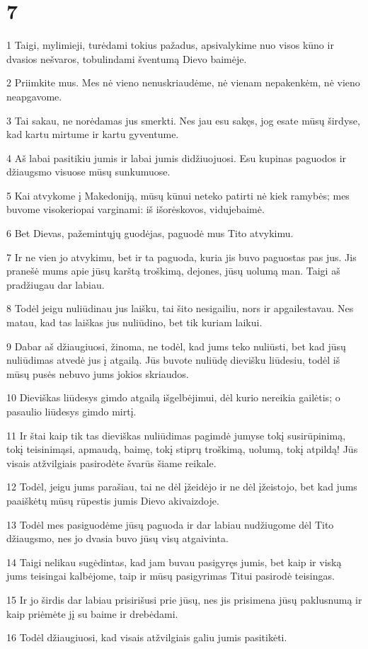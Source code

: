 \chapter{7}


\par 1 Taigi, mylimieji, turėdami tokius pažadus, apsivalykime nuo visos kūno ir dvasios nešvaros, tobulindami šventumą Dievo baimėje. 
\par 2 Priimkite mus. Mes nė vieno nenuskriaudėme, nė vienam nepakenkėm, nė vieno neapgavome. 
\par 3 Tai sakau, ne norėdamas jus smerkti. Nes jau esu sakęs, jog esate mūsų širdyse, kad kartu mirtume ir kartu gyventume. 
\par 4 Aš labai pasitikiu jumis ir labai jumis didžiuojuosi. Esu kupinas paguodos ir džiaugsmo visuose mūsų sunkumuose. 
\par 5 Kai atvykome į Makedoniją, mūsų kūnui neteko patirti nė kiek ramybės; mes buvome visokeriopai varginami: iš išorės­kovos, viduje­baimė. 
\par 6 Bet Dievas, pažemintųjų guodėjas, paguodė mus Tito atvykimu. 
\par 7 Ir ne vien jo atvykimu, bet ir ta paguoda, kuria jis buvo paguostas pas jus. Jis pranešė mums apie jūsų karštą troškimą, dejones, jūsų uolumą man. Taigi aš pradžiugau dar labiau. 
\par 8 Todėl jeigu nuliūdinau jus laišku, tai šito nesigailiu, nors ir apgailestavau. Nes matau, kad tas laiškas jus nuliūdino, bet tik kuriam laikui. 
\par 9 Dabar aš džiaugiuosi, žinoma, ne todėl, kad jums teko nuliūsti, bet kad jūsų nuliūdimas atvedė jus į atgailą. Jūs buvote nuliūdę dievišku liūdesiu, todėl iš mūsų pusės nebuvo jums jokios skriaudos. 
\par 10 Dieviškas liūdesys gimdo atgailą išgelbėjimui, dėl kurio nereikia gailėtis; o pasaulio liūdesys gimdo mirtį. 
\par 11 Ir štai kaip tik tas dieviškas nuliūdimas pagimdė jumyse tokį susirūpinimą, tokį teisinimąsi, apmaudą, baimę, tokį stiprų troškimą, uolumą, tokį atpildą! Jūs visais atžvilgiais pasirodėte švarūs šiame reikale. 
\par 12 Todėl, jeigu jums parašiau, tai ne dėl įžeidėjo ir ne dėl įžeistojo, bet kad jums paaiškėtų mūsų rūpestis jumis Dievo akivaizdoje. 
\par 13 Todėl mes pasiguodėme jūsų paguoda ir dar labiau nudžiugome dėl Tito džiaugsmo, nes jo dvasia buvo jūsų visų atgaivinta. 
\par 14 Taigi nelikau sugėdintas, kad jam buvau pasigyręs jumis, bet kaip ir viską jums teisingai kalbėjome, taip ir mūsų pasigyrimas Titui pasirodė teisingas. 
\par 15 Ir jo širdis dar labiau prisirišusi prie jūsų, nes jis prisimena jūsų paklusnumą ir kaip priėmėte jį su baime ir drebėdami. 
\par 16 Todėl džiaugiuosi, kad visais atžvilgiais galiu jumis pasitikėti.


